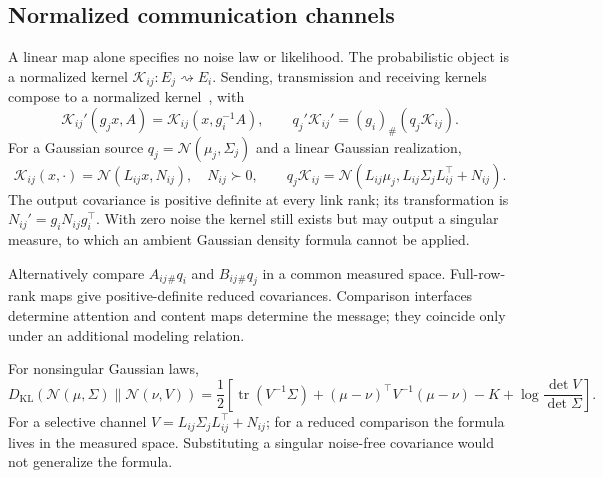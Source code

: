 \subsection{Normalized communication channels}\label{sec:channel_laws}
A linear map alone specifies no noise law or likelihood. The probabilistic object is a normalized kernel $\mathcal K_{ij}:E_j\rightsquigarrow E_i$. Sending, transmission and receiving kernels compose to a normalized kernel~\cite{Kallenberg2021}, with
\begin{equation}
\mathcal K_{ij}'(g_jx,A)=\mathcal K_{ij}(x,g_i^{-1}A),\qquad
q_j'\mathcal K_{ij}'=(g_i)_\#(q_j\mathcal K_{ij}).
\label{eq:channel_covariance}
\end{equation}
For a Gaussian source $q_j=\mathcal N(\mu_j,\Sigma_j)$ and a linear Gaussian realization,
\begin{equation}
\mathcal K_{ij}(x,\cdot)=\mathcal N(L_{ij}x,N_{ij}),\quad N_{ij}\succ0,\qquad
q_j\mathcal K_{ij}
=\mathcal N(L_{ij}\mu_j,L_{ij}\Sigma_jL_{ij}^\top+N_{ij}).
\label{eq:gaussian_communication}
\end{equation}
The output covariance is positive definite at every link rank; its transformation is $N_{ij}'=g_iN_{ij}g_i^\top$. With zero noise the kernel still exists but may output a singular measure, to which an ambient Gaussian density formula cannot be applied.

Alternatively compare $A_{ij}{}_\#q_i$ and $B_{ij}{}_\#q_j$ in a common measured space. Full-row-rank maps give positive-definite reduced covariances. Comparison interfaces determine attention and content maps determine the message; they coincide only under an additional modeling relation.

For nonsingular Gaussian laws,
\begin{equation}
D_{\mathrm{KL}}(\mathcal N(\mu,\Sigma)\|\mathcal N(\nu,V))
=\frac12\left[\operatorname{tr}(V^{-1}\Sigma)+(\mu-\nu)^\top V^{-1}(\mu-\nu)
-K+\log\frac{\det V}{\det\Sigma}\right].
\label{eq:gaussian_kl}
\end{equation}
For a selective channel $V=L_{ij}\Sigma_jL_{ij}^\top+N_{ij}$; for a reduced comparison the formula lives in the measured space. Substituting a singular noise-free covariance would not generalize the formula.

